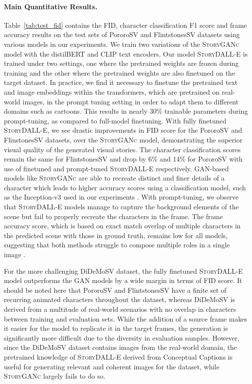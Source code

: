 \documentclass[runningheads]{llncs}
\newcommand{\sdalle}[1]{\textsc{StoryDALL-E}}
\newcommand{\sgan}[1]{\textsc{StoryGANc}}
\begin{document}
\paragraph{Main Quantitative Results.}
Table~\ref{tab:test_fid} contains the FID, character classification F1 score and frame accuracy results on the test sets of PororoSV and FlintstonesSV datasets using various models in our experiments. We train two variations of the \sgan{} model with the distilBERT and CLIP text encoders. Our model \sdalle{} is trained under two settings, one where the pretrained weights are frozen during training and the other where the pretrained weights are also finetuned on the target dataset. In practice, we find it necessary to finetune the pretrained text and image embeddings within the transformers, which are pretrained on real-world images, in the prompt tuning setting in order to adapt them to different domains such as cartoons. This results in nearly 30\% trainable parameters during prompt-tuning, as compared to full-model finetuning. With fully finetuned \sdalle{}, we see drastic improvements in FID score for the PororoSV and FlinstonesSV datasets, over the \sgan{} model, demonstrating the superior visual quality of the generated visual stories. The character classification scores remain the same for FlintstonesSV and drop by 6\% and 14\% for PororoSV with use of finetuned and prompt-tuned \sdalle{} respectively. GAN-based models like \sgan{} are able to recreate distinct and finer details of a character which leads to higher accuracy scores using a classification model, such as the Inception-v3 used in our experiments \cite{maharana2021improving}. With prompt-tuning, we observe that \sdalle{} models manage to capture the background elements of the scene but fail to properly recreate the characters in the frame. The frame accuracy score, which is based on exact match overlap of multiple characters in the predicted scene with those in ground truth, remains low for all models, suggesting that both methods struggle to compose multiple roles in a single image \cite{cho2022dall}. 

For the more challenging DiDeMoSV dataset, the fully finetuned \sdalle{} model outperforms the GAN models by a wide margin in terms of FID score. It should be noted here that PororoSV and FlintstonesSV have a finite set of recurring animated characters throughout the dataset, whereas DiDeMoSV is derived from a multitude of real-world scenarios with no overlap in characters between training and evaluation sets. While the addition of a source frame makes it easier for the model to replicate it in the target frames, the generation is significantly more difficult due to the diversity in evaluation samples. However, since the DiDeMoSV dataset contains images from the real-world domain, the pretrained knowledge of \sdalle{} derived from Conceptual Captions is useful for generating relevant and coherent images for the dataset, while \sgan{} largely fails to do so.
\end{document}
